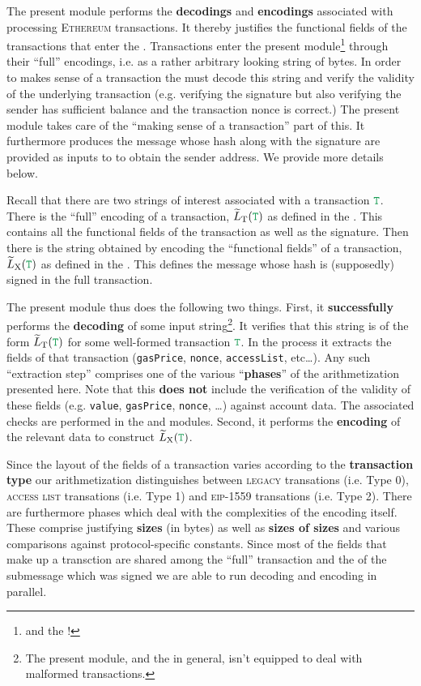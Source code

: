 The present module performs the \rlp{} \textbf{decodings} and \textbf{encodings} associated with processing \textsc{Ethereum} transactions.
It thereby justifies the functional fields of the transactions that enter the \zkEvm{}.
Transactions enter the present module\footnote{and the \zkEvm{}!} through their ``full'' \rlp{} encodings, i.e. as a rather arbitrary looking string of bytes.
In order to makes sense of a transaction the \zkEvm{} must decode this string and verify the validity of the underlying transaction (e.g. verifying the signature but also verifying the sender has sufficient balance and the transaction nonce is correct.)
The present module takes care of the ``making sense of a transaction'' part of this.
It furthermore produces the message whose hash along with the signature are provided as inputs to  to obtain the sender address.
We provide more details below.

Recall that there are two \rlp{} strings of interest associated with a transaction $\locTransaction$.
There is the ``full'' \rlp{} encoding of a transaction, $\locLtTildeOfT$ as defined in the \cite{EYP-London}.
This contains all the functional fields of the transaction as well as the signature.
Then there is the \rlp{} string obtained by \rlp{} encoding the ``functional fields'' of a transaction, $\locLxTildeOfT$ as defined in the \cite{EYP-London}.
This defines the message whose hash is (supposedly) signed in the full transaction.

The present module thus does the following two things.
First, it \textbf{successfully} performs the \rlp{} \textbf{decoding} of some input string\footnote{The present module, and the \zkEvm{} in general, isn't equipped to deal with malformed transactions.}.
It verifies that this string is of the form $\locLtTildeOfT$ for some well-formed transaction $\locTransaction$.
In the process it extracts the fields of that transaction (\texttt{gasPrice}, \texttt{nonce}, \texttt{accessList}, etc\dots{}).
Any such ``extraction step'' comprises one of the various ``\textbf{phases}'' of the arithmetization presented here.
Note that this \textbf{does not} include the verification of the validity of these fields (e.g. \texttt{value}, \texttt{gasPrice}, \texttt{nonce}, \dots) against account data.
The associated checks are performed in the \userTxnDataMod{} and \hubMod{} modules.
Second, it performs the \rlp{} \textbf{encoding} of the relevant data to construct $\locLxTildeOfT$.

Since the layout of the fields of a transaction varies according to the \textbf{transaction type} our arithmetization distinguishes between
\textsc{legacy} transations (i.e. Type 0),
\textsc{access list} transations (i.e. Type 1) and
\textsc{eip-1559} transations (i.e. Type 2).
There are furthermore phases which deal with the complexities of the \rlp{} encoding itself.
These comprise justifying \textbf{sizes} (in bytes) as well as \textbf{sizes of sizes} and various comparisons against protocol-specific constants.
Since most of the fields that make up a transction are shared among the ``full'' transaction \rlp{} and the \rlp{} of the submessage which was signed we are able to run decoding and encoding in parallel.

